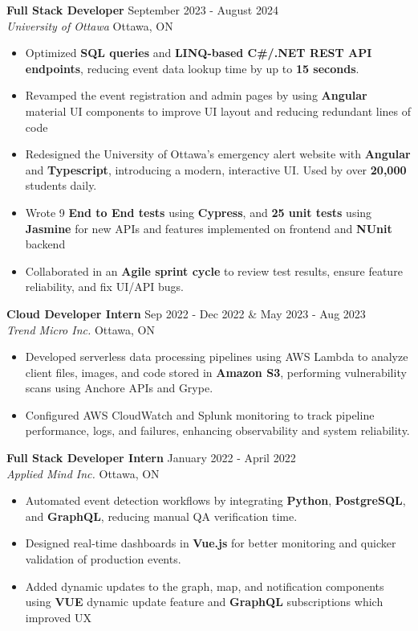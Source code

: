 \documentclass[a4paper]{article}
\begin{document}
\textbf{Full Stack Developer} \hfill September 2023 - August 2024\\
\textit{University of Ottawa} \hfill Ottawa, ON\\
\vspace{-2mm}
\begin{itemize} \itemsep -2pt
    \item Optimized \textbf{SQL queries} and \textbf{LINQ-based C\#/.NET REST API endpoints}, reducing event data lookup time by up to \textbf{15 seconds}.
    \item Revamped the event registration and admin pages by using \textbf{Angular} material UI components to improve UI layout and reducing redundant lines of code
    \item Redesigned the University of Ottawa's emergency alert website with \textbf{Angular} and \textbf{Typescript}, introducing a modern, interactive UI. Used by over \textbf{20,000} students daily.
    \item Wrote 9 \textbf{End to End tests} using \textbf{Cypress}, and \textbf{25 unit tests} using \textbf{Jasmine} for new APIs and features implemented on frontend and \textbf{NUnit} backend
    \item Collaborated in an \textbf{Agile sprint cycle} to review test results, ensure feature reliability, and fix UI/API bugs.
\end{itemize}
\textbf{Cloud Developer Intern} \hfill Sep 2022 - Dec 2022 \& May 2023 - Aug 2023\\
\textit{Trend Micro Inc.} \hfill Ottawa, ON\\
\vspace{-2mm}
\begin{itemize} \itemsep -2pt
    \item Developed serverless data processing pipelines using AWS Lambda to analyze client files, images, and code stored in \textbf{Amazon S3}, performing vulnerability scans using Anchore APIs and Grype.
    \item Configured AWS CloudWatch and Splunk monitoring to track pipeline performance, logs, and failures, enhancing observability and system reliability.
\end{itemize}
\textbf{Full Stack Developer Intern} \hfill January 2022 - April 2022\\
\textit{Applied Mind Inc.} \hfill Ottawa, ON\\
\vspace{-2mm}
\begin{itemize} \itemsep -2pt
    \item Automated event detection workflows by integrating \textbf{Python}, \textbf{PostgreSQL}, and \textbf{GraphQL}, reducing manual QA verification time.
    \item Designed real-time dashboards in \textbf{Vue.js} for better monitoring and quicker validation of production events.
     \item Added dynamic updates to the graph, map, and notification components using \textbf{VUE} dynamic update feature and \textbf{GraphQL} subscriptions which improved UX
\end{itemize}
\end{document}
